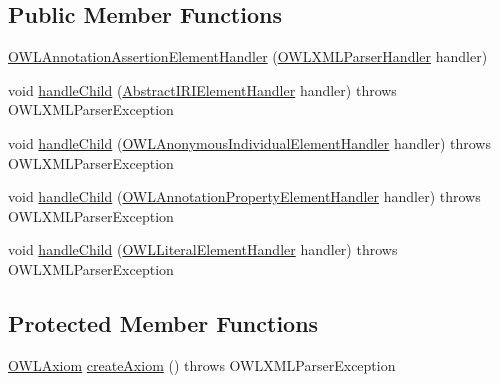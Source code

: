 \subsection*{Public Member Functions}
\begin{DoxyCompactItemize}
\item 
\hyperlink{classorg_1_1coode_1_1owlapi_1_1owlxmlparser_1_1_o_w_l_annotation_assertion_element_handler_aee8af8ea9b3174ef30b39d8e56100f4a}{O\-W\-L\-Annotation\-Assertion\-Element\-Handler} (\hyperlink{classorg_1_1coode_1_1owlapi_1_1owlxmlparser_1_1_o_w_l_x_m_l_parser_handler}{O\-W\-L\-X\-M\-L\-Parser\-Handler} handler)
\item 
void \hyperlink{classorg_1_1coode_1_1owlapi_1_1owlxmlparser_1_1_o_w_l_annotation_assertion_element_handler_a421cf97fda5dcbeefc836c12c14c9a69}{handle\-Child} (\hyperlink{classorg_1_1coode_1_1owlapi_1_1owlxmlparser_1_1_abstract_i_r_i_element_handler}{Abstract\-I\-R\-I\-Element\-Handler} handler)  throws O\-W\-L\-X\-M\-L\-Parser\-Exception 
\item 
void \hyperlink{classorg_1_1coode_1_1owlapi_1_1owlxmlparser_1_1_o_w_l_annotation_assertion_element_handler_a545113ec59d659c2d1eb60b8ba3aef3d}{handle\-Child} (\hyperlink{classorg_1_1coode_1_1owlapi_1_1owlxmlparser_1_1_o_w_l_anonymous_individual_element_handler}{O\-W\-L\-Anonymous\-Individual\-Element\-Handler} handler)  throws O\-W\-L\-X\-M\-L\-Parser\-Exception 
\item 
void \hyperlink{classorg_1_1coode_1_1owlapi_1_1owlxmlparser_1_1_o_w_l_annotation_assertion_element_handler_accaeb0e63cf443ce2b799b9d5af63521}{handle\-Child} (\hyperlink{classorg_1_1coode_1_1owlapi_1_1owlxmlparser_1_1_o_w_l_annotation_property_element_handler}{O\-W\-L\-Annotation\-Property\-Element\-Handler} handler)  throws O\-W\-L\-X\-M\-L\-Parser\-Exception 
\item 
void \hyperlink{classorg_1_1coode_1_1owlapi_1_1owlxmlparser_1_1_o_w_l_annotation_assertion_element_handler_a12b96a017680f06b74814689863e6cf0}{handle\-Child} (\hyperlink{classorg_1_1coode_1_1owlapi_1_1owlxmlparser_1_1_o_w_l_literal_element_handler}{O\-W\-L\-Literal\-Element\-Handler} handler)  throws O\-W\-L\-X\-M\-L\-Parser\-Exception 
\end{DoxyCompactItemize}
\subsection*{Protected Member Functions}
\begin{DoxyCompactItemize}
\item 
\hyperlink{interfaceorg_1_1semanticweb_1_1owlapi_1_1model_1_1_o_w_l_axiom}{O\-W\-L\-Axiom} \hyperlink{classorg_1_1coode_1_1owlapi_1_1owlxmlparser_1_1_o_w_l_annotation_assertion_element_handler_a895088d7c8f6156aed6dca2f65137c68}{create\-Axiom} ()  throws O\-W\-L\-X\-M\-L\-Parser\-Exception 
\end{DoxyCompactItemize}
